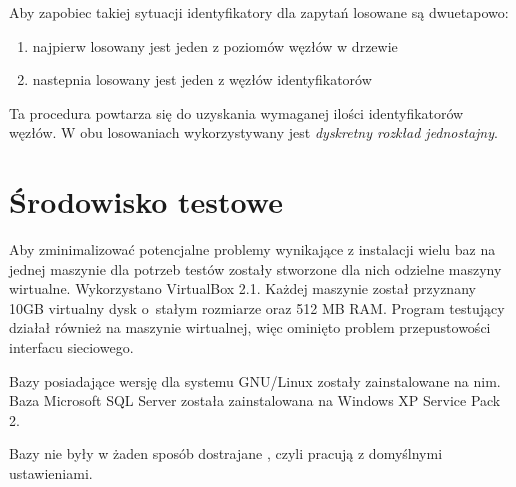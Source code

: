 Aby zapobiec takiej sytuacji identyfikatory dla zapytań losowane są dwuetapowo:
\begin{enumerate}
 \item najpierw losowany jest jeden z poziomów węzłów w drzewie
 \item nastepnia losowany jest jeden z węzłów identyfikatorów
\end{enumerate}
Ta procedura powtarza się do uzyskania wymaganej ilości identyfikatorów węzłów. 
W obu losowaniach wykorzystywany jest \emph{dyskretny rozkład jednostajny}. 








\section{Środowisko testowe}

Aby zminimalizować potencjalne problemy wynikające z instalacji wielu baz na 
jednej maszynie dla potrzeb testów zostały stworzone dla nich odzielne maszyny wirtualne. 
Wykorzystano VirtualBox 2.1. Każdej maszynie został przyznany 10GB virtualny dysk 
o~stałym rozmiarze oraz 512 MB RAM. Program testujący działał również na maszynie wirtualnej, 
więc ominięto problem przepustowości interfacu sieciowego. 

Bazy posiadające wersję dla systemu GNU/Linux zostały zainstalowane na nim. 
Baza Microsoft SQL Server została zainstalowana na Windows XP Service Pack 2.

Bazy nie były w żaden sposób dostrajane , czyli pracują z domyślnymi ustawieniami. 
